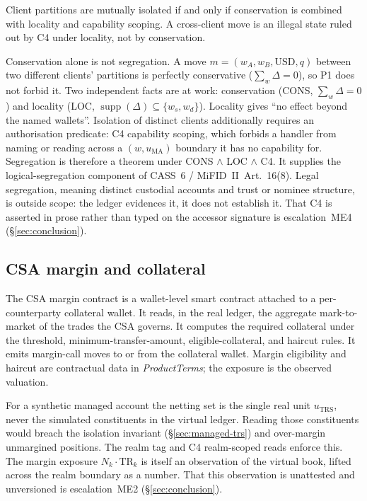 \begin{theorem}[Segregation]
\label{thm:seg}
Client partitions are mutually isolated if and only if conservation is combined with locality and
capability scoping. A cross-client move is an illegal state ruled out by C4 under locality, not by
conservation.
\end{theorem}

Conservation alone is not segregation. A move $m=(w_A,w_B,\text{USD},q)$ between two
different clients' partitions is perfectly conservative ($\sum_w\Delta=0$), so P1 does not
forbid it. Two independent facts are at work: conservation (CONS, $\sum_w\Delta=0$) and
locality (LOC, $\operatorname{supp}(\Delta)\subseteq\{w_s,w_d\}$). Locality gives ``no
effect beyond the named wallets''. Isolation of distinct clients additionally requires an
authorisation predicate: C4 capability scoping, which forbids a handler from naming or
reading across a $(w,u_{\mathrm{MA}})$ boundary it has no capability for. Segregation is
therefore a theorem under CONS $\wedge$ LOC $\wedge$ C4. It supplies the logical-segregation
component of CASS~6 / MiFID~II~Art.~16(8). Legal segregation, meaning distinct custodial
accounts and trust or nominee structure, is outside scope: the ledger evidences it, it does
not establish it. That C4 is asserted in prose rather than typed on the accessor signature
is escalation~ME4 (\S\ref{sec:conclusion}).

\subsection{CSA margin and collateral}
\label{sec:managed-csa}

The CSA margin contract is a wallet-level smart contract attached to a per-counterparty
collateral wallet. It reads, in the real ledger, the aggregate mark-to-market of the trades
the CSA governs. It computes the required collateral under the threshold,
minimum-transfer-amount, eligible-collateral, and haircut rules. It emits margin-call moves
to or from the collateral wallet. Margin eligibility and haircut are contractual data in
\textit{ProductTerms}; the exposure is the observed valuation.

For a synthetic managed account the netting set is the single real unit $u_{\mathrm{TRS}}$,
never the simulated constituents in the virtual ledger. Reading those constituents would
breach the isolation invariant (\S\ref{sec:managed-trs}) and over-margin unmargined
positions. The realm tag and C4 realm-scoped reads enforce this. The margin exposure
$N_k\cdot\mathrm{TR}_k$ is itself an observation of the virtual book, lifted across the
realm boundary as a number. That this observation is unattested and unversioned is
escalation~ME2 (\S\ref{sec:conclusion}).


